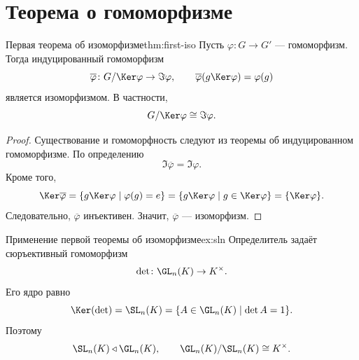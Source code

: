 
\section{Теорема о гомоморфизме}

\begin{Theorem}{Первая теорема об изоморфизме}{thm:first-iso}
	Пусть $\varphi\colon G\to G'$ --- гомоморфизм. Тогда индуцированный гомоморфизм
	\[
	\overline\varphi\colon G/\Ker\varphi \to \Im\varphi,
	\qquad
	\overline\varphi(g\Ker\varphi)=\varphi(g)
	\]
	является изоморфизмом. В частности,
	\[
	G/\Ker\varphi \cong \Im\varphi.
	\]
\end{Theorem}

\begin{proof}
	Существование и гомоморфность следуют из теоремы об индуцированном гомоморфизме. По определению
	\[
	\Im\overline\varphi=\Im\varphi.
	\]
	Кроме того,
	\[
	\Ker\overline\varphi = \{g\Ker\varphi \mid \varphi(g)=e\} = \{g\Ker\varphi \mid g\in \Ker\varphi\} = \{\Ker\varphi\}.
	\]
	Следовательно, $\overline\varphi$ инъективен. Значит, $\overline\varphi$ --- изоморфизм.
\end{proof}

\begin{Example}{Применение первой теоремы об изоморфизме}{ex:sln}
	Определитель задаёт сюръективный гомоморфизм
	\[
	\det\colon \GL_n(K)\to K^{\times}.
	\]
	Его ядро равно
	\[
	\Ker(\det)=\SL_n(K)=\{A\in \GL_n(K)\mid \det A=1\}.
	\]
	Поэтому
	\[
	\SL_n(K)\triangleleft \GL_n(K),
	\qquad
	\GL_n(K)/\SL_n(K)\cong K^{\times}.
	\]
\end{Example}
